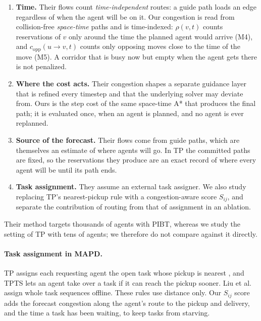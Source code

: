 \begin{enumerate}
  \item \textbf{Time.} Their flows count \emph{time-independent} routes: a
  guide path loads an edge regardless of when the agent will be on it. Our
  congestion is read from collision-free \emph{space-time} paths and is
  time-indexed: $\rho(v,t)$ counts reservations of $v$ only around the time the
  planned agent would arrive (M4), and $c_{\mathrm{opp}}(u\to v,t)$ counts only
  opposing moves close to the time of the move (M5). A corridor that is busy now
  but empty when the agent gets there is not penalized.
  \item \textbf{Where the cost acts.} Their congestion shapes a separate
  guidance layer that is refined every timestep and that the underlying
  solver may deviate from. Ours is the step cost of the same space-time A*
  that produces the final path; it is evaluated once, when an agent is
  planned, and no agent is ever replanned.
  \item \textbf{Source of the forecast.} Their flows come from guide paths,
  which are themselves an estimate of where agents will go. In TP the
  committed paths are fixed, so the reservations they produce are an exact
  record of where every agent will be until its path ends.
  \item \textbf{Task assignment.} They assume an external task assigner.
  We also study replacing TP's nearest-pickup rule with a congestion-aware
  score $S_{ij}$, and separate the contribution of routing from that of
  assignment in an ablation.
\end{enumerate}
Their method targets thousands of agents with PIBT, whereas we study the
setting of TP with tens of agents; we therefore do not compare against it
directly.

\paragraph{Task assignment in MAPD.}
TP assigns each requesting agent the open task whose pickup is nearest
\cite{ma2017lifelong}, and TPTS lets an agent take over a task if it can reach
the pickup sooner. Liu et al.~\cite{liu2019task} assign whole task sequences
offline. These rules use distance only. Our $S_{ij}$ score adds the forecast
congestion along the agent's route to the pickup and delivery, and the time a
task has been waiting, to keep tasks from starving.
